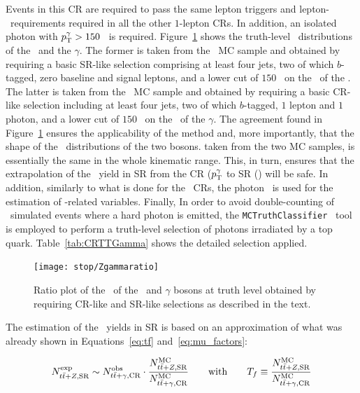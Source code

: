 		Events in this \ac{CR} are required to pass the same lepton triggers and lepton-\pt\ requirements required in all the other $1$-lepton \acp{CR}. In addition, an isolated photon with $p_{\mathrm{T}}^{\gamma} > 150$ \GeV\ is required. Figure~\ref{fig:ZGammaratio} shows the truth-level \pt\ distributions of the \Zboson\ and the $\gamma$. The former is taken from the \ttZ\ \ac{MC} sample and obtained by requiring a basic \ac{SR}-like selection comprising at least four jets, two of which $b$-tagged, zero baseline and signal leptons, and a lower cut of $150$ \GeV\ on the \pt\ of the \Zboson. The latter is taken from the \ttgamma\ \ac{MC} sample and obtained by requiring a basic \ac{CR}-like selection including at least four jets, two of which $b$-tagged, $1$ lepton and $1$ photon, and a lower cut of $150$ \GeV\ on the \pt\ of the $\gamma$. The agreement found in Figure~\ref{fig:ZGammaratio} ensures the applicability of the method and, more importantly, that the shape of the \pt\ distributions of the two bosons. taken from the two \ac{MC} samples, is essentially the same in the whole kinematic range. This, in turn, ensures that the extrapolation of the \ttZ\ yield in \ac{SR} from the CR ($p_{\mathrm{T}}^{\gamma}$ to SR (\met) will be safe. In addition, similarly to what is done for the \Zboson\ \acp{CR}, the photon \pt\ is used for the estimation of \met-related variables. Finally, In order to avoid double-counting of \ttbar\ simulated events where a hard photon is emitted, the \verb+MCTruthClassifier+~\cite{MCTruthClassifier} tool is employed to perform a truth-level selection of photons irradiated by a top quark. Table~\ref{tab:CRTTGamma} shows the detailed selection applied. 

		\begin{figure}[htpb]
		  \centering
		  \texttt{[image: stop/Zgammaratio]}
		  \caption{Ratio plot of the \pt\ of the \Zboson\ and $\gamma$ bosons at truth level obtained by requiring \ac{CR}-like and \ac{SR}-like selections as described in the text.}
		  \label{fig:ZGammaratio}
		\end{figure}

		The estimation of the \ttZ\ yields in \ac{SR} is based on an approximation of what was already shown in Equations~\ref{eq:tf} and~\ref{eq:mu_factors}:
		
		\begin{equation}
			N_{t\bar{t}+Z,\mathrm{SR}}^{\mathrm{exp}} \sim N_{t\bar{t}+\gamma,\mathrm{CR}}^{\mathrm{obs}} \cdot \frac{N_{t\bar{t}+Z,\mathrm{SR}}^{\mathrm{MC}}}{N_{t\bar{t}+\gamma,\mathrm{CR}}^{\mathrm{MC}}} \qquad \mathrm{with} \qquad T_f \equiv \frac{N_{t\bar{t}+Z,\mathrm{SR}}^{\mathrm{MC}}}{N_{t\bar{t}+\gamma,\mathrm{CR}}^{\mathrm{MC}}}
		\label{eq:ttZ_estimation}
		\end{equation}

